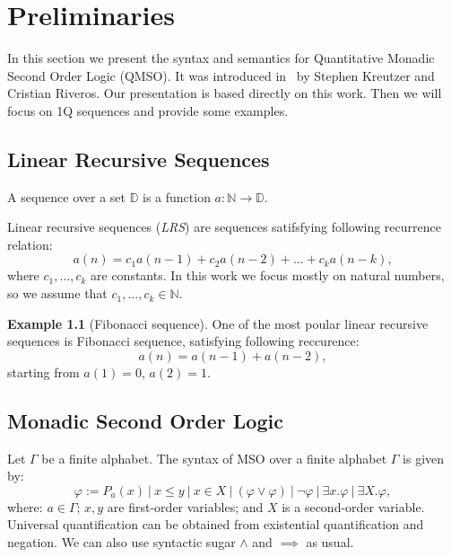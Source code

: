\documentclass[en]{pracamgr}
\theoremstyle{definition}
\newtheorem{example}{Example}[section]
\begin{document}
\chapter{Preliminaries}
In this section we present the syntax and semantics for Quantitative Monadic Second Order Logic (QMSO). It was introduced in~\cite{KreutzerR13} by Stephen Kreutzer and Cristian Riveros. Our presentation is based directly on this work. Then we will focus on 1Q sequences and provide some examples.

\section{Linear Recursive Sequences}
A sequence over a set $\mathbb{D}$ is a function $a : \mathbb{N} \rightarrow \mathbb{D}$.

Linear recursive sequences (\emph{LRS}) are sequences satifsfying following recurrence relation:
$$a(n) = c_1 a(n-1) + c_2 a(n-2) + \ldots + c_k a(n-k),$$
where $c_1,\ldots,c_k$ are constants. In this work we focus mostly on natural numbers, so we assume that $c_1,\ldots ,c_k \in \mathbb{N}$.

\begin{example}[Fibonacci sequence]
    One of the most poular linear recursive sequences is Fibonacci sequence, satisfying following reccurence:
    $$a(n) = a(n-1) + a(n-2),$$
    starting from $a(1) = 0$, $a(2) = 1$.
\end{example}

\section{Monadic Second Order Logic}

Let $\Gamma$ be a finite alphabet. The syntax of MSO over a finite alphabet $\Gamma$ is given by:
$$ \varphi := P_a(x) \ | \ x \leq y \ | \ x \in X \ | \ (\varphi \lor \varphi) \ | \ \neg \varphi \ | \ \exists x. \varphi \ | \ \exists X . \varphi, $$
where: $a \in \Gamma$; $x, y$ are first-order variables; and $X$ is a second-order variable. Universal quantification can be obtained from existential quantification and negation. We can also use syntactic sugar $\land$ and $\implies$ as usual.
\end{document}

